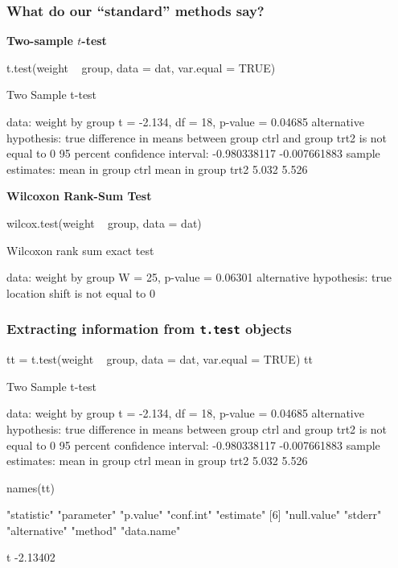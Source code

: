 \documentclass[a4paper]{article}\usepackage[]{graphicx}\usepackage[]{xcolor}
\begin{document}
\subsubsection{What do our ``standard'' methods say?}
\textbf{Two-sample \( t \)-test}
\begin{Schunk}
\begin{Sinput}
t.test(weight ~ group, data = dat, var.equal = TRUE)
\end{Sinput}
\begin{Soutput}

	Two Sample t-test

data:  weight by group
t = -2.134, df = 18, p-value = 0.04685
alternative hypothesis: true difference in means between group ctrl and group trt2 is not equal to 0
95 percent confidence interval:
 -0.980338117 -0.007661883
sample estimates:
mean in group ctrl mean in group trt2 
             5.032              5.526 
\end{Soutput}
\end{Schunk}
\textbf{Wilcoxon Rank-Sum Test}
\begin{Schunk}
\begin{Sinput}
wilcox.test(weight ~ group, data = dat)
\end{Sinput}
\begin{Soutput}

	Wilcoxon rank sum exact test

data:  weight by group
W = 25, p-value = 0.06301
alternative hypothesis: true location shift is not equal to 0
\end{Soutput}
\end{Schunk}
\subsubsection{Extracting information from \lstinline|t.test| objects}
\begin{Schunk}
\begin{Sinput}
tt = t.test(weight ~ group, data = dat, var.equal = TRUE)
tt
\end{Sinput}
\begin{Soutput}

	Two Sample t-test

data:  weight by group
t = -2.134, df = 18, p-value = 0.04685
alternative hypothesis: true difference in means between group ctrl and group trt2 is not equal to 0
95 percent confidence interval:
 -0.980338117 -0.007661883
sample estimates:
mean in group ctrl mean in group trt2 
             5.032              5.526 
\end{Soutput}
\begin{Sinput}
names(tt)
\end{Sinput}
\begin{Soutput}
 [1] "statistic"   "parameter"   "p.value"     "conf.int"    "estimate"   
 [6] "null.value"  "stderr"      "alternative" "method"      "data.name"  
\end{Soutput}
\begin{Soutput}
       t 
-2.13402 
\end{Soutput}
\end{Schunk}
\end{document}
